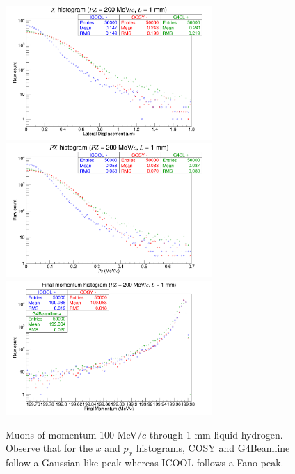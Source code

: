 \begin{figure}[H]
  \centering
    \includegraphics[width=0.7\textwidth]{Benchmarking/LH/X.200.1.png} 
    \includegraphics[width=0.7\textwidth]{Benchmarking/LH/PX.200.1.png} 
    \includegraphics[width=0.7\textwidth]{Benchmarking/LH/strag.200.1.png} 
  \caption[Muons of momentum 200 MeV/$c$ through 1 mm liquid hydrogen.]{Muons of momentum 100 MeV/$c$ through 1 mm liquid hydrogen. Observe that for the $x$ and $p_x$ histograms, COSY and G4Beamline follow a Gaussian-like peak whereas ICOOL follows a Fano peak.}
  \label{fig:200.1}
\end{figure}

